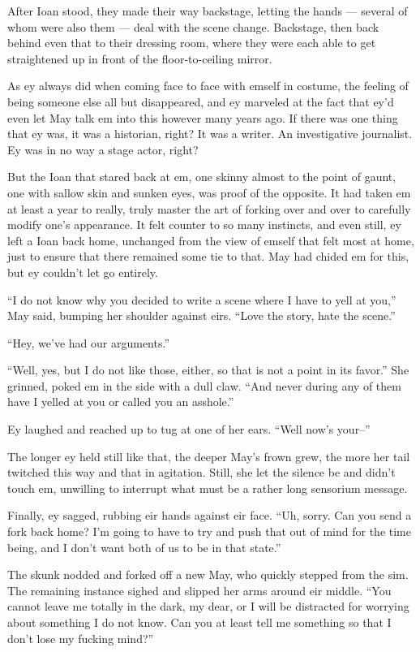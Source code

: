 After Ioan stood, they made their way backstage, letting the hands — several of whom were also them — deal with the scene change. Backstage, then back behind even that to their dressing room, where they were each able to get straightened up in front of the floor-to-ceiling mirror.

As ey always did when coming face to face with emself in costume, the feeling of being someone else all but disappeared, and ey marveled at the fact that ey'd even let May talk em into this however many years ago. If there was one thing that ey was, it was a historian, right? It was a writer. An investigative journalist. Ey was in no way a stage actor, right?

But the Ioan that stared back at em, one skinny almost to the point of gaunt, one with sallow skin and sunken eyes, was proof of the opposite. It had taken em at least a year to really, truly master the art of forking over and over to carefully modify one's appearance. It felt counter to so many instincts, and even still, ey left a Ioan back home, unchanged from the view of emself that felt most at home, just to ensure that there remained some tie to that. May had chided em for this, but ey couldn't let go entirely.

``I do not know why you decided to write a scene where I have to yell at you,'' May said, bumping her shoulder against eirs. ``Love the story, hate the scene.''

``Hey, we've had our arguments.''

``Well, yes, but I do not like those, either, so that is not a point in its favor.'' She grinned, poked em in the side with a dull claw. ``And never during any of them have I yelled at you or called you an asshole.''

Ey laughed and reached up to tug at one of her ears. ``Well now's your--''

The longer ey held still like that, the deeper May's frown grew, the more her tail twitched this way and that in agitation. Still, she let the silence be and didn't touch em, unwilling to interrupt what must be a rather long sensorium message.

Finally, ey sagged, rubbing eir hands against eir face. ``Uh, sorry. Can you send a fork back home? I'm going to have to try and push that out of mind for the time being, and I don't want both of us to be in that state.''

The skunk nodded and forked off a new May, who quickly stepped from the sim. The remaining instance sighed and slipped her arms around eir middle. ``You cannot leave me totally in the dark, my dear, or I will be distracted for worrying about something I do not know. Can you at least tell me something so that I don't lose my fucking mind?''

